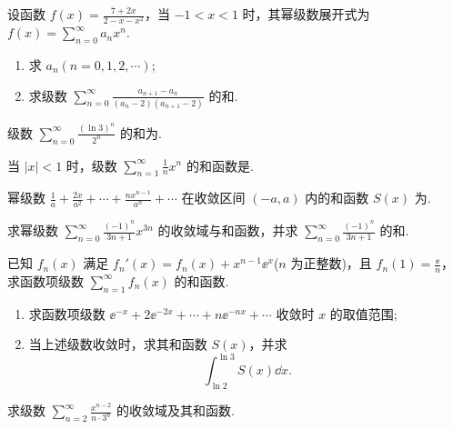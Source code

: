 	\begin{ti}
		设函数 $f(x) = \frac{7 + 2x}{2 - x - x^{2}}$，当 $-1 < x < 1$ 时，其幂级数展开式为 $f(x) = \sum_{n=0}^{\infty} a_{n} x^{n}$.
		\begin{enumerate}
			\item 求 $a_{n} (n = 0,1,2,\cdots)$;
			\item 求级数 $\sum_{n=0}^{\infty} \frac{a_{n+1} - a_{n}}{(a_{n} - 2) (a_{n+1} - 2)}$ 的和.
		\end{enumerate}
	\end{ti}

	\begin{ti}
		级数 $\sum_{n=0}^{\infty} \frac{(\ln 3)^{n}}{2^{n}}$ 的和为\htwo.
	\end{ti}

	\begin{ti}
		当 $|x| < 1$ 时，级数 $\sum_{n=1}^{\infty} \frac{1}{n} x^{n}$ 的和函数是\kuo.

		\twoch{$\ln(1 - x)$}{$\ln \frac{1}{1 - x}$}{$\ln(x - 1)$}{$- \ln (x - 1)$}
	\end{ti}

	\begin{ti}
		幂级数 $\frac{1}{a} + \frac{2x}{a^{2}} + \cdots + \frac{nx^{n-1}}{a^{n}} + \cdots$ 在收敛区间 $(-a,a)$ 内的和函数 $S(x)$ 为\htwo.
	\end{ti}

	\begin{ti}
		求幂级数 $\sum_{n=0}^{\infty} \frac{(-1)^{n}}{3n + 1} x^{3n}$ 的收敛域与和函数，并求 $\sum_{n=0}^{\infty} \frac{(-1)^{n}}{3n + 1}$ 的和.
	\end{ti}

	\begin{ti}
		已知 $f_{n}(x)$ 满足 $f_{n}'(x) = f_{n}(x) + x^{n-1} \ee^{x}$($n$ 为正整数)，且 $f_{n}(1) = \frac{\ee}{n}$，求函数项级数 $\sum_{n=1}^{\infty} f_{n}(x)$ 的和函数.
	\end{ti}

	\begin{ti}
		\begin{enumerate}
			\item 求函数项级数 $\ee^{-x} + 2 \ee^{-2x} + \cdots + n \ee^{-nx} + \cdots$ 收敛时 $x$ 的取值范围;
			\item 当上述级数收敛时，求其和函数 $S(x)$，并求
			\[
				\int_{\ln 2}^{\ln 3} S(x) \dd{x}.
			\]
		\end{enumerate}
	\end{ti}

	\begin{ti}
		求级数 $\sum_{n=2}^{\infty} \frac{x^{n-2}}{n \cdot 3^{n}}$ 的收敛域及其和函数.
	\end{ti}

